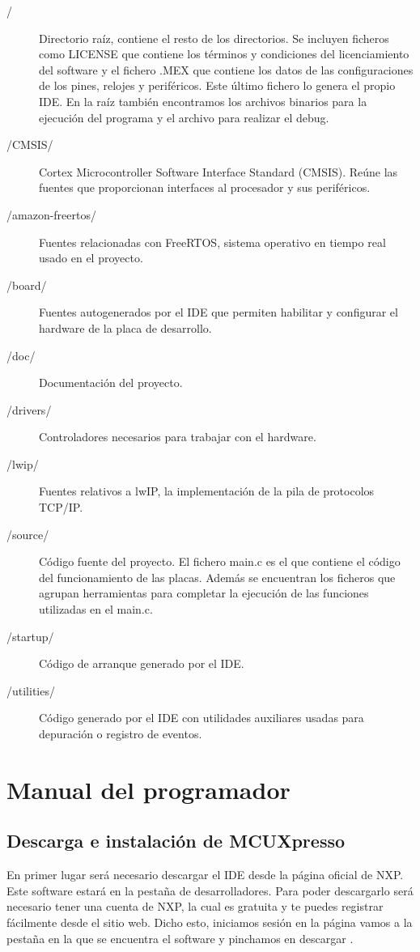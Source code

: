 \begin{description}
  \item[/] Directorio raíz, contiene el resto de los directorios. Se incluyen ficheros como LICENSE que contiene los términos y condiciones del licenciamiento del software y el fichero .MEX que contiene los datos de las configuraciones de los pines, relojes y periféricos. Este último fichero lo genera el propio IDE. En la raíz también encontramos los archivos binarios para la ejecución del programa y el archivo para realizar el debug.
  \item[/CMSIS/] Cortex Microcontroller Software Interface Standard (CMSIS). Reúne las fuentes que proporcionan interfaces al procesador y sus periféricos.
  \item[/amazon-freertos/] Fuentes relacionadas con FreeRTOS, sistema operativo en tiempo real usado en el proyecto.
  \item[/board/] Fuentes autogenerados por el IDE que permiten habilitar y configurar el hardware de la placa de desarrollo.
  \item[/doc/] Documentación del proyecto.
  \item[/drivers/] Controladores necesarios para trabajar con el hardware.
  \item[/lwip/] Fuentes relativos a lwIP, la implementación de la pila de protocolos TCP/IP.
  \item[/source/] Código fuente del proyecto. El fichero main.c es el que contiene el código del funcionamiento de las placas. Además se encuentran los ficheros que agrupan herramientas para completar la ejecución de las funciones utilizadas en el main.c.
  \item[/startup/] Código de arranque generado por el IDE.
  \item[/utilities/] Código generado por el IDE con utilidades auxiliares usadas para depuración o registro de eventos.
\end{description}

\section{Manual del programador}
\subsection{Descarga e instalación de MCUXpresso}
En primer lugar será necesario descargar el IDE desde la página oficial de NXP. Este software estará en la pestaña de desarrolladores. Para poder descargarlo será necesario tener una cuenta de NXP, la cual es gratuita y te puedes registrar fácilmente desde el sitio web.
Dicho esto, iniciamos sesión en la página vamos a la pestaña en la que se encuentra el software y pinchamos en descargar \cite{DLMCUX}. 

